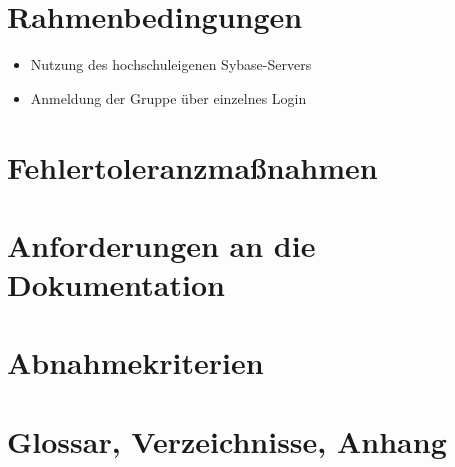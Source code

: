 \part{Rahmenbedingungen}
\begin{itemize}
\item Nutzung des hochschuleigenen Sybase-Servers
\item Anmeldung der Gruppe über einzelnes Login
\end{itemize}

\part{Fehlertoleranzmaßnahmen}


\part{Anforderungen an die Dokumentation}


\part{Abnahmekriterien}


\part{Glossar, Verzeichnisse, Anhang}

